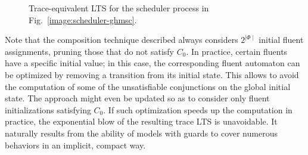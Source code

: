 \begin{figure}\centering
{}
\caption{Trace-equivalent LTS for the scheduler process in Fig.~\ref{image:scheduler-ghmsc}.\label{image:scheduler-lts}}
\end{figure}

Note that the composition technique described always considers $2^{\mid\Phi\mid}$ initial fluent assignments, pruning those that do not satisfy $C_0$. In practice, certain fluents have a specific initial value; in this case, the corresponding fluent automaton can be optimized by removing a transition from its initial state. This allows to avoid the computation of some of the unsatisfiable conjunctions on the global initial state. The approach might even be updated so as to consider only fluent initializations satisfying $C_0$. If such optimization speeds up the computation in practice, the exponential blow of the resulting trace LTS is unavoidable. It naturally results from the ability of models with guards to cover numerous behaviors in an implicit, compact way. 
